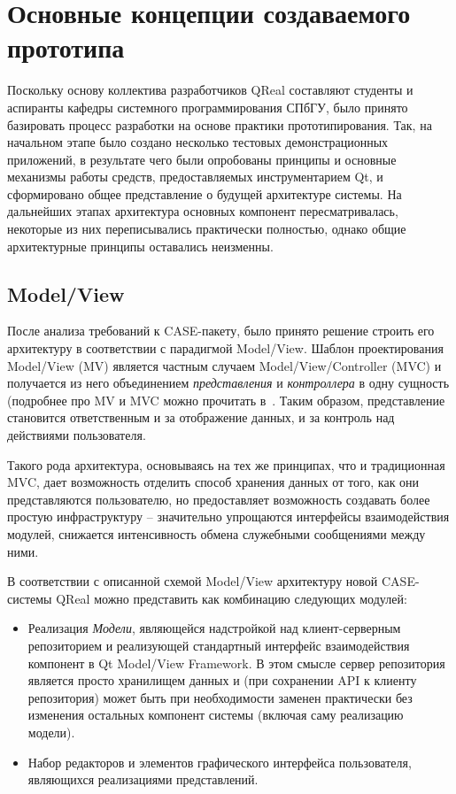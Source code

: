 \documentclass[a5paper]{article}
\begin{document}
\section{Основные концепции создаваемого прототипа}

Поскольку основу коллектива разработчиков
QReal составляют студенты и аспиранты
кафедры системного программирования СПбГУ, было принято базировать
процесс разработки на основе практики прототипирования. Так, на
начальном этапе было создано несколько тестовых демонстрационных
приложений, в результате чего были опробованы принципы и основные
механизмы работы средств, предоставляемых инструментарием Qt, и
сформировано общее представление о будущей архитектуре системы. На
дальнейших этапах архитектура основных компонент пересматривалась,
некоторые из них переписывались практически полностью, однако общие
архитектурные принципы оставались неизменны.

\subsection{Model/View}

После анализа требований к CASE-пакету,
было принято решение строить его архитектуру в соответствии с
парадигмой Model/View.
Шаблон проектирования Model/View (MV) является частным случаем
Model/View/Controller (MVC) и получается из него объединением
\textit{представления} и \textit{контроллера} в одну сущность
(подробнее про MV и MVC можно прочитать в~\cite{somethingAboutMvAndMvc}. Таким образом,
представление становится ответственным и за отображение данных, и за
контроль над действиями пользователя.

Такого рода архитектура, основываясь на тех же принципах, что и
традиционная MVC, дает возможность отделить способ хранения данных от
того, как они представляются пользователю, но предоставляет возможность
создавать более простую инфраструктуру – значительно упрощаются
интерфейсы взаимодействия модулей, снижается интенсивность обмена
служебными сообщениями между ними.

В соответствии с описанной схемой Model/View архитектуру новой
CASE-системы QReal можно представить как комбинацию следующих модулей:

\begin{itemize}
  \item Реализация \textit{Модели}, являющейся надстройкой над
	клиент-серверным репозиторием и реализующей стандартный интерфейс
	взаимодействия компонент в Qt Model/View Framework. В этом смысле сервер репозитория
	является просто хранилищем данных и (при сохранении
	API к клиенту репозитория) может быть при
	необходимости заменен практически без изменения остальных компонент
	системы (включая саму реализацию модели).
  \item 
	Набор редакторов и элементов графического интерфейса пользователя,
	являющихся реализациями представлений.
\end{itemize}
\end{document}
